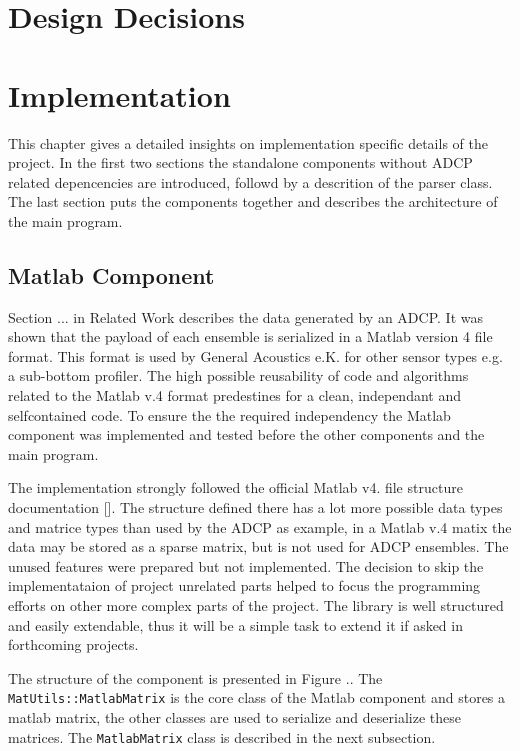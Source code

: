 
\chapter{Design Decisions}
\chapter{Implementation}
This chapter gives a detailed insights on implementation specific details of the project. In the first two sections the standalone components without ADCP related depencencies  are introduced, followd by a descrition of the parser class. The last section puts the components together and describes the architecture of the main program.  
\section{Matlab Component}
Section ... in Related Work describes the data generated by an ADCP. It was shown that the payload of each ensemble is serialized in a Matlab version 4 file format. This format is used by General Acoustics e.K. for other sensor types e.g. a sub-bottom profiler. The high possible reusability of code and algorithms related to the Matlab v.4 format predestines for a clean, independant and selfcontained code.
To ensure the the required independency the Matlab component was implemented and tested before the other components and the main program.

The implementation strongly followed the official Matlab v4. file structure documentation []. The structure defined there has a lot more possible data types and matrice types than used by the ADCP as example, in a Matlab v.4 matix the data may be stored as a sparse matrix, but is not used for ADCP ensembles. The unused features were prepared but not implemented.
The decision to skip the implementataion of project unrelated parts helped to focus the programming efforts on other more complex parts of the project. The library is well structured and easily extendable, thus it will be a simple task to extend it if asked in forthcoming projects.

The structure of the component is presented in Figure .. The \texttt{MatUtils::MatlabMatrix} is the core class of the Matlab component and stores a matlab matrix, the other classes are used to serialize and deserialize these matrices. The \texttt{MatlabMatrix} class is described in the next subsection.
